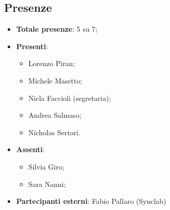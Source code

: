 \documentclass[11pt]{article}
\begin{document}
		\subsection{Presenze}
			\begin{itemize}
				\item \textbf{Totale presenze}: 5 su 7;
				\item \textbf{Presenti}:
				\begin{itemize}
					\item Lorenzo Piran; 
					\item Michele Masetto;
					\item Nicla Faccioli (segretaria);
					\item Andrea Salmaso;
					\item Nicholas Sertori.
				\end{itemize}
				\item \textbf{Assenti}: 
					\begin{itemize}
						\item Silvia Giro;
						\item Sara Nanni;
					\end{itemize}
				\item \textbf{Partecipanti esterni}: Fabio Pallaro (Synclab)
			\end{itemize}
		
		\newpage
		
\end{document}
